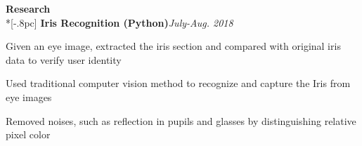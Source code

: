 

{\large \bf Research} \\*[-.8pc]
\underline{\hspace{6in}} 
{\bf Iris Recognition (Python)}\hfill {\it July-Aug. 2018}\\
\vspace{-4mm}
\begin{list2}
\item Given an eye image, extracted the iris section and compared with original iris data to verify user identity
\item Used traditional computer vision method to recognize and capture the Iris from eye images
\item Removed noises, such as reflection in pupils and glasses by distinguishing relative pixel color\\
\end{list2}

